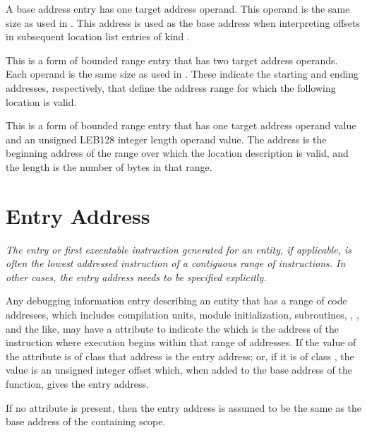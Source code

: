 \begin{enumerate}[1. ]
\addtocounter{enumi}{5}
\itembfnl{\DWRLEbaseaddressTARG}
A base address entry has one target address operand.
This operand is the same size as used in \DWFORMaddr.
This address is used as the base address when interpreting
offsets in subsequent location list entries of kind
\DWRLEoffsetpair.

\itembfnl{\DWRLEstartendTARG}
This is a form of bounded range entry that
has two target address operands. Each
operand is the same size as used in \DWFORMaddr.
These indicate the starting and ending addresses,
respectively, that define the address range for which
the following location is valid.
       
\itembfnl{\DWRLEstartlengthTARG}
This is a form of bounded range entry that
has one target address operand value and an unsigned LEB128
integer length operand value. The address is the beginning address
of the range over which the location description is valid, and
the length is the number of bytes in that range.

\end{enumerate}

\section{Entry Address}
\label{chap:entryaddress}
\textit{The entry or first executable instruction generated
for an entity, if applicable, is often the lowest addressed
instruction of a contiguous range of instructions. In other
cases, the entry address needs to be specified explicitly.}

Any debugging information entry describing an entity that has
a range of code addresses, which includes compilation units,
module initialization, subroutines, 
,
,
and the like, may have a \DWATentrypcDEFN{} attribute 
 to indicate the 
 which is the address of the 
instruction where execution begins 
within that range\hypertarget{chap:entryaddressofscope}{}
of addresses. 
If the value of the \DWATentrypcNAME{} attribute is of
class \CLASSaddress{} that address is the entry address;
or, if it is of class
\CLASSconstant, the value is an unsigned integer offset which, 
when added to the base address of the function, gives the entry
address. 


If no \DWATentrypcNAME{} attribute is present,
then the entry address is assumed to be the same as the
base address of the containing scope.



